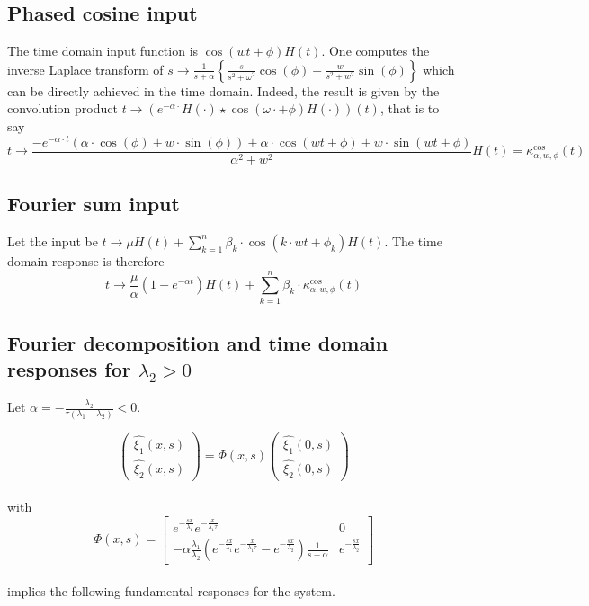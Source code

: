 \documentclass[preprint]{elsarticle}
\begin{document}
\subsection{Phased cosine input}

The time domain input function is $\cos\left(wt+\phi\right)H\left(t\right)$.
One computes the inverse Laplace transform of $s\rightarrow\frac{1}{s+\alpha}\left\{ \frac{s}{s^{2}+\omega^{2}}\cos\left(\phi\right)-\frac{w}{s^{2}+w^{2}}\sin\left(\phi\right)\right\} $
which can be directly achieved in the time domain. Indeed, the result
is given by the convolution product $t\rightarrow\left(e^{-\alpha\cdot}H\left(\cdot\right)\star \cos\left(\omega\cdot+\phi\right)H\left(\cdot\right)\right)\left(t\right)$,
that is to say 
\[
t\rightarrow\frac{-e^{-\alpha\cdot t}\left(\alpha\cdot \cos\left(\phi\right)+w\cdot \sin\left(\phi\right)\right)+\alpha\cdot \cos\left(wt+\phi\right)+w\cdot \sin\left(wt+\phi\right)}{\alpha^{2}+w^{2}}H\left(t\right)=\kappa_{\alpha,w,\phi}^{\text{cos}}\left(t\right)
\]



\subsection{Fourier sum input}

Let the input be $t\rightarrow\mu H\left(t\right)+\sum_{k=1}^{n}\beta_{k}\cdot \cos\left(k\cdot wt+\phi_{k}\right)H\left(t\right)$.
The time domain response is therefore 
\[
t\rightarrow\frac{\mu}{\alpha}\left(1-e^{-\alpha t}\right)H\left(t\right)+\sum_{k=1}^{n}\beta_{k}\cdot\kappa_{\alpha,w,\phi}^{\text{cos}}\left(t\right)
\]



\subsection{Fourier decomposition and time domain responses for $\lambda_{2}>0$}

Let $\alpha=-\frac{\lambda_{2}}{\tau\left(\lambda_{1}-\lambda_{2}\right)}<0$.

\[
\left(\begin{array}{c}
\widehat{\xi_{1}}\left(x,s\right)\\
\widehat{\xi_{2}}\left(x,s\right)
\end{array}\right)=\Phi\left(x,s\right)\left(\begin{array}{c}
\widehat{\xi_{1}}\left(0,s\right)\\
\widehat{\xi_{2}}\left(0,s\right)
\end{array}\right)
\]
\\
with 
\[
\Phi\left(x,s\right)=\left[\begin{array}{cc}
e^{-\frac{sx}{\lambda_{1}}}e^{-\frac{x}{\lambda_{1}\tau}} & 0\\
-\alpha\frac{\lambda_{1}}{\lambda_{2}}\left(e^{-\frac{sx}{\lambda_{1}}}e^{-\frac{x}{\lambda_{1}\tau}}-e^{-\frac{sx}{\lambda_{2}}}\right)\frac{1}{s+\alpha} & e^{-\frac{sx}{\lambda_{2}}}
\end{array}\right]
\]
\\
implies the following fundamental responses for the system.
\end{document}

